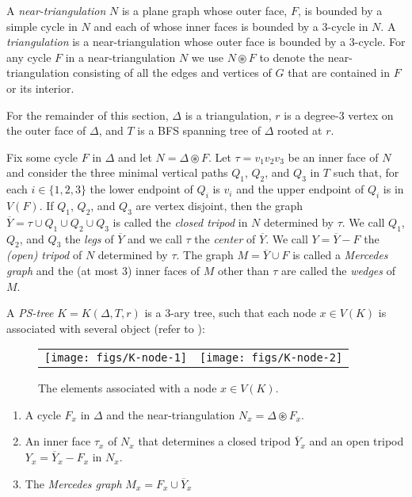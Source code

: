 \documentclass{patmorin}
\begin{document}
A \emph{near-triangulation} $N$ is a plane graph whose outer face, $F$, is bounded by a simple cycle in $N$ and each of whose inner faces is bounded by a 3-cycle in $N$.  A \emph{triangulation} is a near-triangulation whose outer face is bounded by a 3-cycle.  For any cycle $F$ in a near-triangulation $N$ we use $N\circledast F$ to denote the near-triangulation consisting of all the edges and vertices of $G$ that are contained in $F$ or its interior.

For the remainder of this section, $\Delta$ is a triangulation, $r$ is a degree-3 vertex on the outer face of $\Delta$, and $T$ is a BFS spanning tree of $\Delta$ rooted at $r$.

Fix some cycle $F$ in $\Delta$ and let $N=\Delta\circledast F$.
Let $\tau=v_1v_2v_3$ be an inner face of $N$ and consider the three minimal vertical paths $Q_1$, $Q_2$, and $Q_3$ in $T$ such that, for each $i\in\{1,2,3\}$ the lower endpoint of $Q_i$ is $v_i$ and the upper endpoint of $Q_i$ is in $V(F)$.  If $Q_1$, $Q_2$, and $Q_3$ are vertex disjoint, then the graph $\overline{Y}=\tau\cup Q_1\cup Q_2\cup Q_3$ is called the \emph{closed tripod} in $N$ determined by $\tau$.  We call $Q_1$, $Q_2$, and $Q_3$ the \emph{legs} of $\overline{Y}$ and we call $\tau$ the \emph{center} of $\overline{Y}$.  We call $Y=\overline{Y}-F$ the \emph{(open) tripod} of $N$ determined by $\tau$.  The graph $M=\overline{Y}\cup F$ is called a \emph{Mercedes graph} and the (at most 3) inner faces of $M$ other than $\tau$ are called the \emph{wedges} of $M$.

A \emph{PS-tree}  $K=K(\Delta, T, r)$ is a 3-ary tree, such that each node $x\in V(K)$ is associated with several object (refer to ):

\begin{figure}
  \begin{center}
    \begin{tabular}{cc}
      \texttt{[image: figs/K-node-1]} &
      \texttt{[image: figs/K-node-2]}
    \end{tabular}
  \end{center}
  \caption{The elements associated with a node $x\in V(K)$.}
\end{figure}

\begin{enumerate}
  \item A cycle $F_x$ in $\Delta$ and the near-triangulation $N_x=\Delta\circledast F_x$.
  
  \item An inner face $\tau_x$ of $N_x$ that determines a closed tripod $\overline{Y}_x$ and an open tripod $Y_x=\overline{Y}_x-F_x$ in $N_x$.
  
  \item The \emph{Mercedes graph} $M_x=F_x\cup \overline{Y}_x$
\end{enumerate}
\end{document}
